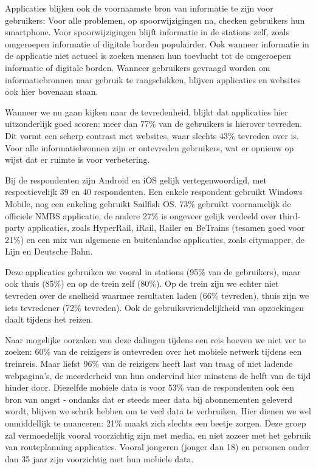 Applicaties blijken ook de voornaamste bron van informatie te zijn voor gebruikers: Voor alle problemen, op spoorwijzigingen na, checken gebruikers hun smartphone. Voor spoorwijzigingen blijft informatie in de stations zelf, zoals omgeroepen informatie of digitale borden populairder. Ook wanneer informatie in de applicatie niet actueel is zoeken mensen hun toevlucht tot de omgeroepen informatie of digitale borden. Wanneer gebruikers gevraagd worden om informatiebronnen naar gebruik te rangschikken, blijven applicaties en websites ook hier bovenaan staan.

Wanneer we nu gaan kijken naar de tevredenheid, blijkt dat applicaties hier uitzonderlijk goed scoren: meer dan 77\% van de gebruikers is hierover tevreden. Dit vormt een scherp contrast met websites, waar slechts 43\% tevreden over is. Voor alle informatiebronnen zijn er ontevreden gebruikers, wat er opnieuw op wijst dat er ruimte is voor verbetering.

Bij de respondenten zijn Android en iOS gelijk vertegenwoordigd, met respectievelijk 39 en 40 respondenten. Een enkele respondent gebruikt Windows Mobile, nog een enkeling gebruikt Sailfish OS. 73\% gebruikt voornamelijk de officiele NMBS applicatie, de andere 27\% is ongeveer gelijk verdeeld over third-party applicaties, zoals HyperRail, iRail, Railer en BeTrains (tesamen goed voor 21\%) en een mix van algemene en buitenlandse applicaties, zoals citymapper, de Lijn en Deutsche Bahn.

Deze applicaties gebruiken we vooral in stations (95\% van de gebruikers), maar ook thuis (85\%) en op de trein zelf (80\%). Op de trein zijn we echter niet tevreden over de snelheid waarmee resultaten laden (66\% tevreden), thuis zijn we iets tevredener (72\% tevreden). Ook de gebruiksvriendelijkheid van opzoekingen daalt tijdens het reizen. 

Naar mogelijke oorzaken van deze dalingen tijdens een reis hoeven we niet ver te zoeken: 60\% van de reizigers is ontevreden over het mobiele netwerk tijdens een treinreis. Maar liefst 96\% van de reizigers heeft last van traag of niet ladende webpagina's, de meerderheid van hun ondervind hier minstens de helft van de tijd hinder door. Diezelfde mobiele data is voor 53\% van de respondenten ook een bron van angst - ondanks dat er steeds meer data bij abonnementen geleverd wordt, blijven we schrik hebben om te veel data te verbruiken. Hier dienen we wel onmiddellijk te nuanceren: 21\% maakt zich slechts een beetje zorgen. Deze groep zal vermoedelijk vooral voorzichtig zijn met media, en niet zozeer met het gebruik van routeplanning applicaties. Vooral jongeren (jonger dan 18) en personen ouder dan 35 jaar zijn voorzichtig met hun mobiele data.

